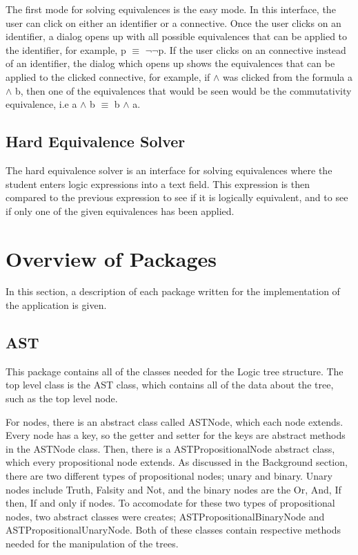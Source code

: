 \documentclass{report}
\begin{document}
The first mode for solving equivalences is the easy mode. In this interface,
the user can click on either an identifier or a connective. Once the user
clicks on an identifier, a dialog opens up with all possible equivalences
that can be applied to the identifier, for example, p $\equiv$ $\neg$$\neg$p.
If the user clicks on an connective instead of an identifier, the dialog which
opens up shows the equivalences that can be applied to the clicked connective,
for example, if $\land$ was clicked from the formula a $\land$ b, then
one of the equivalences that would be seen would be the commutativity
equivalence, i.e a $\land$ b $\equiv$ b $\land$ a.


\subsection{Hard Equivalence Solver}

The hard equivalence solver is an interface for solving equivalences where
the student enters logic expressions into a text field. This expression is
then compared to the previous expression to see if it is logically equivalent,
and to see if only one of the given equivalences has been applied. 


\section{Overview of Packages}
In this section, a description of each package written for the
implementation of the application is given.

\subsection{AST}
This package contains all of the classes needed for the Logic tree structure.
The top level class is the AST class, which contains all of the data about
the tree, such as the top level node.

For nodes, there is an abstract class called ASTNode, which each node extends.
Every node has a key, so the getter and setter for the keys are abstract methods
in the ASTNode class. Then, there is a ASTPropositionalNode abstract class, which
every propositional node extends. As discussed in the Background section, there
are two different types of propositional nodes; unary and binary. Unary nodes
include Truth, Falsity and Not, and the binary nodes are the Or, And, If then,
If and only if nodes. To accomodate for these two types of propositional nodes,
two abstract classes were creates; ASTPropositionalBinaryNode and
ASTPropositionalUnaryNode. Both of these classes contain respective methods
needed for the manipulation of the trees.
\end{document}
